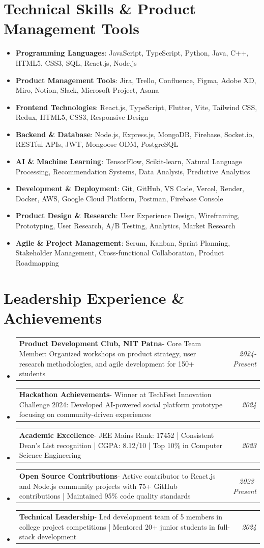\documentclass[a4paper,11pt]{article}
\makeatletter
\newcommand{\resumeItem}[2]{
  \item{
    \textbf{#1}{\hspace{0.5mm}#2 \vspace{-0.5mm}}
  }
}
\newcommand{\resumePOR}[3]{
\vspace{0.5mm}\item
    \begin{tabular*}{0.97\textwidth}[t]{l@{\extracolsep{\fill}}r}
        \textbf{#1}\hspace{0.3mm}#2 & \textit{\small{#3}} 
    \end{tabular*}
    \vspace{-2mm}
}
\newcommand{\resumeSubItem}[2]{\resumeItem{#1}{#2}\vspace{-4pt}}
\newcommand{\resumeSubHeadingListStart}{\begin{itemize}[leftmargin=*,labelsep=1mm]}
\newcommand{\resumeHeadingSkillStart}{\begin{itemize}[leftmargin=*,itemsep=1.7mm, rightmargin=2ex]}
\newcommand{\resumeSubHeadingListEnd}{\end{itemize}\vspace{2mm}}
\newcommand{\resumeHeadingSkillEnd}{\end{itemize}\vspace{-2mm}}
\makeatother
\begin{document}
\section{\textbf{Technical Skills \& Product Management Tools}}
\vspace{-0.4mm}
\resumeHeadingSkillStart
\resumeSubItem{Programming Languages}{: JavaScript, TypeScript, Python, Java, C++, HTML5, CSS3, SQL, React.js, Node.js}
\resumeSubItem{Product Management Tools}{: Jira, Trello, Confluence, Figma, Adobe XD, Miro, Notion, Slack, Microsoft Project, Asana}
\resumeSubItem{Frontend Technologies}{: React.js, TypeScript, Flutter, Vite, Tailwind CSS, Redux, HTML5, CSS3, Responsive Design}
\resumeSubItem{Backend \& Database}{: Node.js, Express.js, MongoDB, Firebase, Socket.io, RESTful APIs, JWT, Mongoose ODM, PostgreSQL}
\resumeSubItem{AI \& Machine Learning}{: TensorFlow, Scikit-learn, Natural Language Processing, Recommendation Systems, Data Analysis, Predictive Analytics}
\resumeSubItem{Development \& Deployment}{: Git, GitHub, VS Code, Vercel, Render, Docker, AWS, Google Cloud Platform, Postman, Firebase Console}
\resumeSubItem{Product Design \& Research}{: User Experience Design, Wireframing, Prototyping, User Research, A/B Testing, Analytics, Market Research}
\resumeSubItem{Agile \& Project Management}{: Scrum, Kanban, Sprint Planning, Stakeholder Management, Cross-functional Collaboration, Product Roadmapping}
\resumeHeadingSkillEnd
\vspace{-2mm}

\section{\textbf{Leadership Experience \& Achievements}}
\vspace{-0.2mm}
\resumeSubHeadingListStart
\resumePOR{Product Development Club, NIT Patna}{- Core Team Member: Organized workshops on product strategy, user research methodologies, and agile development for 150+ students}{2024-Present}
\resumePOR{Hackathon Achievements}{- Winner at TechFest Innovation Challenge 2024: Developed AI-powered social platform prototype focusing on community-driven experiences}{2024}
\resumePOR{Academic Excellence}{- JEE Mains Rank: 17452 | Consistent Dean's List recognition | CGPA: 8.12/10 | Top 10\% in Computer Science Engineering}{2023}
\resumePOR{Open Source Contributions}{- Active contributor to React.js and Node.js community projects with 75+ GitHub contributions | Maintained 95\% code quality standards}{2023-Present}
\resumePOR{Technical Leadership}{- Led development team of 5 members in college project competitions | Mentored 20+ junior students in full-stack development}{2024}
\resumeSubHeadingListEnd
\end{document}
